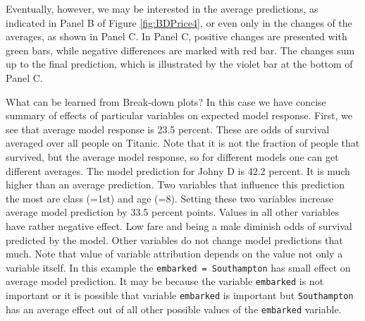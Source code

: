 \documentclass[12pt,]{krantz}
\begin{document}
Eventually, however, we may be interested in the average predictions, as indicated in Panel B of Figure \ref{fig:BDPrice4}, or even only in the changes of the averages, as shown in Panel C. In Panel C, positive changes are presented with green bars, while negative differences are marked with red bar.
The changes sum up to the final prediction, which is illustrated by the violet bar at the bottom of Panel C.

What can be learned from Break-down plots? In this case we have concise summary of effects of particular variables on expected model response.
First, we see that average model response is 23.5 percent. These are odds of survival averaged over all people on Titanic. Note that it is not the fraction of people that survived, but the average model response, so for different models one can get different averages.
The model prediction for Johny D is 42.2 percent. It is much higher than an average prediction. Two variables that influence this prediction the most are class (=1st) and age (=8). Setting these two variables increase average model prediction by 33.5 percent points. Values in all other variables have rather negative effect. Low fare and being a male diminish odds of survival predicted by the model. Other variables do not change model predictions that much.
Note that value of variable attribution depends on the value not only a variable itself. In this example the \texttt{embarked\ =\ Southampton} has small effect on average model prediction. It may be because the variable \texttt{embarked} is not important or it is possible that variable \texttt{embarked} is important but \texttt{Southampton} has an average effect out of all other possible values of the \texttt{embarked} variable.
\end{document}
